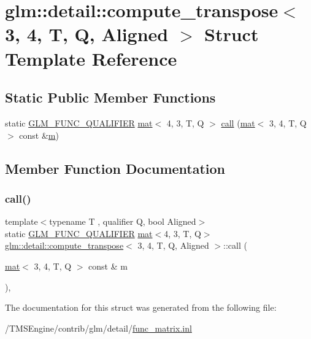 \hypertarget{structglm_1_1detail_1_1compute__transpose_3_013_00_014_00_01_t_00_01_q_00_01_aligned_01_4}{}\section{glm\+:\+:detail\+:\+:compute\+\_\+transpose$<$ 3, 4, T, Q, Aligned $>$ Struct Template Reference}
\label{structglm_1_1detail_1_1compute__transpose_3_013_00_014_00_01_t_00_01_q_00_01_aligned_01_4}
\subsection*{Static Public Member Functions}
\begin{DoxyCompactItemize}
\item 
static \hyperlink{setup_8hpp_a33fdea6f91c5f834105f7415e2a64407}{G\+L\+M\+\_\+\+F\+U\+N\+C\+\_\+\+Q\+U\+A\+L\+I\+F\+I\+ER} \hyperlink{structglm_1_1mat}{mat}$<$ 4, 3, T, Q $>$ \hyperlink{structglm_1_1detail_1_1compute__transpose_3_013_00_014_00_01_t_00_01_q_00_01_aligned_01_4_a64a4ddeead1663b8289e74e0fc262078}{call} (\hyperlink{structglm_1_1mat}{mat}$<$ 3, 4, T, Q $>$ const \&\hyperlink{_s_d_l__opengl__glext_8h_af593500c283bf1a787a6f947f503a5c2}{m})
\end{DoxyCompactItemize}


\subsection{Member Function Documentation}
\mbox{\label{structglm_1_1detail_1_1compute__transpose_3_013_00_014_00_01_t_00_01_q_00_01_aligned_01_4_a64a4ddeead1663b8289e74e0fc262078}} 
\subsubsection{\texorpdfstring{call()}{call()}}
{\footnotesize\ttfamily template$<$typename T , qualifier Q, bool Aligned$>$ \\
static \hyperlink{setup_8hpp_a33fdea6f91c5f834105f7415e2a64407}{G\+L\+M\+\_\+\+F\+U\+N\+C\+\_\+\+Q\+U\+A\+L\+I\+F\+I\+ER} \hyperlink{structglm_1_1mat}{mat}$<$4, 3, T, Q$>$ \hyperlink{structglm_1_1detail_1_1compute__transpose}{glm\+::detail\+::compute\+\_\+transpose}$<$ 3, 4, T, Q, Aligned $>$\+::call (\begin{DoxyParamCaption}\item[{\hyperlink{structglm_1_1mat}{mat}$<$ 3, 4, T, Q $>$ const \&}]{m }\end{DoxyParamCaption})\hspace{0.3cm}{\ttfamily [inline]}, {\ttfamily [static]}}



The documentation for this struct was generated from the following file\+:\begin{DoxyCompactItemize}
\item 
/\+T\+M\+S\+Engine/contrib/glm/detail/\hyperlink{func__matrix_8inl}{func\+\_\+matrix.\+inl}\end{DoxyCompactItemize}
